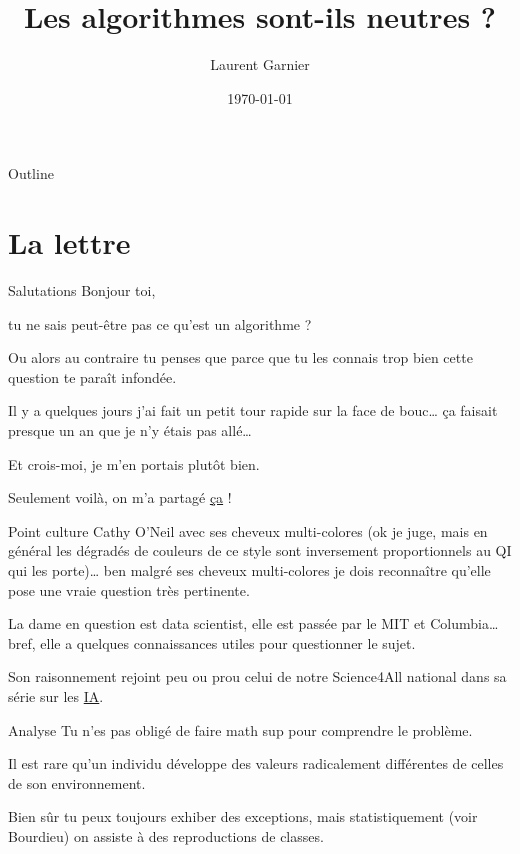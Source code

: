 \documentclass[presentation]{beamer}
\author{Laurent Garnier}
\date{\today}
\title{Les algorithmes sont-ils neutres ?}
\begin{document}
\maketitle
\begin{frame}{Outline}
\tableofcontents
\end{frame}



\section{La lettre}
\label{sec:orga8fff79}
\begin{frame}[label={sec:org185e6e5}]{Salutations}
Bonjour toi,

tu ne sais peut-être pas ce qu'est un algorithme ? 



Ou alors au contraire tu penses que parce que tu les connais trop
bien cette question te paraît infondée.


Il y a quelques jours j'ai fait un petit tour rapide sur la face de
bouc\ldots{} ça faisait presque un an que je n'y étais pas allé\ldots{}


Et crois-moi, je m'en portais plutôt bien.



Seulement voilà, on m'a partagé \href{https://www.franceculture.fr/emissions/la-methode-scientifique/cathy-oneil-pour-une-ethique-des-algorithmes?fbclid=IwAR1NYGNbKTKf0Z5VvWJyhwcfTH0aV0Q86-f1Yn7r4nyyO8TaQcn0W9qSKAg}{ça} !
\end{frame}


\begin{frame}[label={sec:org7ee95de}]{Point culture}
Cathy O'Neil avec ses cheveux multi-colores (ok je juge, mais en
général les dégradés de couleurs de ce style sont inversement
proportionnels au QI qui les porte)\ldots{} ben malgré ses cheveux
multi-colores je dois reconnaître qu'elle pose une vraie question
très pertinente.


La dame en question est data scientist, elle est passée par le MIT
et Columbia\ldots{} bref, elle a quelques connaissances utiles pour
questionner le sujet.


Son raisonnement rejoint peu ou prou celui de notre Science4All
national dans sa série sur les \href{https://www.youtube.com/watch?v=DrjkjPVf7Bw\&list=PLtzmb84AoqRTl0m1b82gVLcGU38miqdrC}{IA}.
\end{frame}



\begin{frame}[label={sec:org537f20c}]{Analyse}
Tu n'es pas obligé de faire math sup pour comprendre le problème.


Il est rare qu'un individu développe des valeurs radicalement
différentes de celles de son environnement.


Bien sûr tu peux toujours exhiber des exceptions, mais
statistiquement (voir Bourdieu) on assiste à des reproductions de
classes.
\end{frame}
\end{document}
